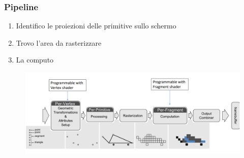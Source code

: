 \subsubsection{Pipeline}
\begin{enumerate}
	\item Identifico le proiezioni delle primitive sullo schermo
	\item Trovo l'area da rasterizzare
	\item La computo
\end{enumerate}
\begin{figure}[h]
	\includegraphics[scale=0.25]{rasterization_pipeline.png}
	\centering
\end{figure}